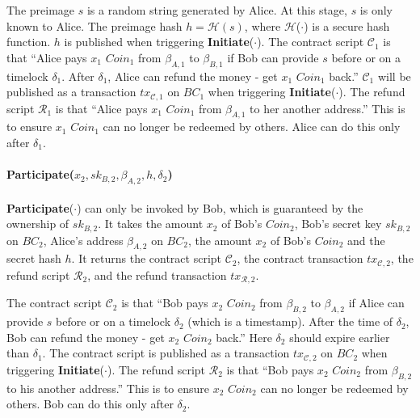 The preimage $s$ is a random string generated by Alice. At this stage, $s$ is only known to Alice.
The preimage hash $h = \mathcal{H}(s)$, where $\mathcal{H}$($\cdot$) is a secure hash function.
$h$ is published when triggering \textbf{Initiate}($\cdot$).
The contract script $\mathcal{C}_1$ is that ``Alice pays $x_1$ $Coin_1$ from $\beta_{A, 1}$ to $\beta_{B, 1}$ if Bob can provide $s$ before or on a timelock $\delta_1$. After $\delta_1$, Alice can refund the money - get $x_1$ $Coin_1$ back.''
$\mathcal{C}_1$ will be published as a transaction $tx_{\mathcal{C}, 1}$ on $BC_1$ when triggering \textbf{Initiate}($\cdot$).
The refund script $\mathcal{R}_1$ is that ``Alice pays $x_1$ $Coin_1$ from $\beta_{A, 1}$ to her another address.'' This is to ensure $x_1$ $Coin_1$ can no longer be redeemed by others. Alice can do this only after $\delta_1$.

\paragraph{\textbf{Participate}($x_2, sk_{B, 2}, \beta_{A, 2}, h, \delta_2$)}
\textbf{Participate}($\cdot$) can only be invoked by Bob, which is guaranteed by the ownership of $sk_{B, 2}$.
It takes the amount $x_2$ of Bob's $Coin_2$,
Bob's secret key $sk_{B, 2}$ on $BC_2$,
Alice's address $\beta_{A, 2}$ on $BC_2$,
the amount $x_2$ of Bob's $Coin_2$
and the secret hash $h$.
It returns the contract script $\mathcal{C}_2$,
the contract transaction $tx_{\mathcal{C}, 2}$,
the refund script $\mathcal{R}_2$,
and the refund transaction $tx_{\mathcal{R}, 2}$.

The contract script $\mathcal{C}_2$ is that ``Bob pays $x_2$ $Coin_2$ from $\beta_{B, 2}$ to $\beta_{A, 2}$ if Alice can provide $s$ before or on a timelock $\delta_2$ (which is a timestamp). After the time of $\delta_2$, Bob can refund the money - get $x_2$ $Coin_2$ back.''
Here $\delta_2$ should expire earlier than $\delta_1$.
The contract script is published as a transaction $tx_{\mathcal{C}, 2}$ on $BC_2$ when triggering \textbf{Initiate}($\cdot$).
The refund script $\mathcal{R}_2$ is that ``Bob pays $x_2$ $Coin_2$ from $\beta_{B, 2}$ to his another address.'' This is to ensure $x_2$ $Coin_2$ can no longer be redeemed by others. Bob can do this only after $\delta_2$.

